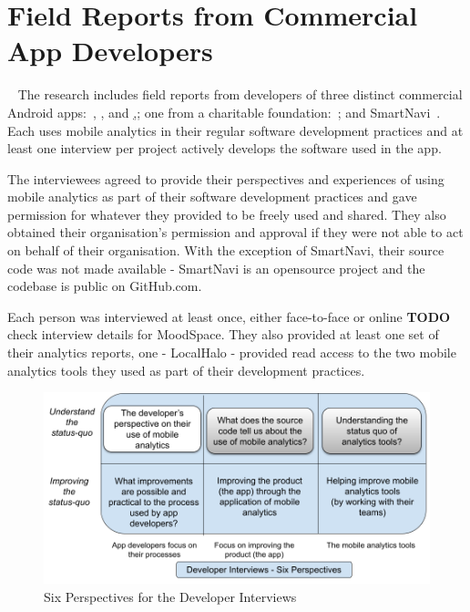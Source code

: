 \section{Field Reports from Commercial App Developers}~\label{section-field-reports-case-studies}
The research includes field reports from developers of three distinct commercial Android apps:~\href{study-moonpig}{}, \href{study-moodspace}{}, and \href{study-localhalo}{,}; one from a charitable foundation:~\href{study-greentech-apps}{}; and SmartNavi~\href{study-smartnavi}{}. Each uses mobile analytics in their regular software development practices and at least one interview per project actively develops the software used in the app.

The interviewees agreed to provide their perspectives and experiences of using mobile analytics as part of their software development practices and gave permission for whatever they provided to be freely used and shared. They also obtained their organisation's permission and approval if they were not able to act on behalf of their organisation. With the exception of SmartNavi, their source code was not made available - SmartNavi is an opensource project and the codebase is public on GitHub.com.

Each person was interviewed at least once, either face-to-face or online \textbf{TODO} check interview details for MoodSpace. They also provided at least one set of their analytics reports, one - LocalHalo - provided read access to the two mobile analytics tools they used as part of their development practices. 

\begin{figure}
    \centering
    \includegraphics[width=15cm]{images/my/developer-interviews-six-perspectives-2x3-matrix.png}
    \caption{Six Perspectives for the Developer Interviews}
    \label{fig:six-perspectives-developer-interviews}
\end{figure}

